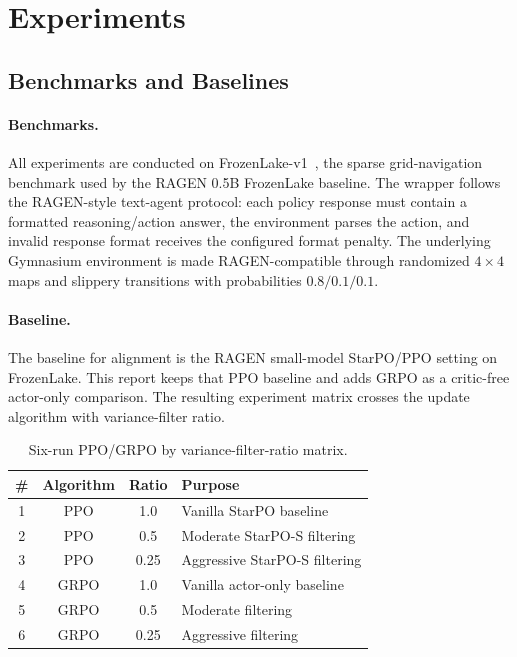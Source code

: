 \section{Experiments}
\label{sec:setup}

\subsection{Benchmarks and Baselines}

\paragraph{Benchmarks.}
All experiments are conducted on FrozenLake-v1~\citep{brockman2016gym}, the sparse grid-navigation benchmark used by the RAGEN 0.5B FrozenLake baseline. The wrapper follows the RAGEN-style text-agent protocol: each policy response must contain a formatted reasoning/action answer, the environment parses the action, and invalid response format receives the configured format penalty. The underlying Gymnasium environment is made RAGEN-compatible through randomized \(4\times4\) maps and slippery transitions with probabilities \(0.8/0.1/0.1\).

\paragraph{Baseline.}
The baseline for alignment is the RAGEN small-model StarPO/PPO setting on FrozenLake. This report keeps that PPO baseline and adds GRPO as a critic-free actor-only comparison. The resulting experiment matrix crosses the update algorithm with variance-filter ratio.

\begin{table}[t]
\centering
\small
\begin{tabularx}{\linewidth}{c c c X}
\toprule
\# & Algorithm & Ratio & Purpose \\
\midrule
1 & PPO & 1.0 & Vanilla StarPO baseline \\
2 & PPO & 0.5 & Moderate StarPO-S filtering \\
3 & PPO & 0.25 & Aggressive StarPO-S filtering \\
4 & GRPO & 1.0 & Vanilla actor-only baseline \\
5 & GRPO & 0.5 & Moderate filtering \\
6 & GRPO & 0.25 & Aggressive filtering \\
\bottomrule
\end{tabularx}
\caption{Six-run PPO/GRPO by variance-filter-ratio matrix.}
\label{tab:matrix}
\end{table}

